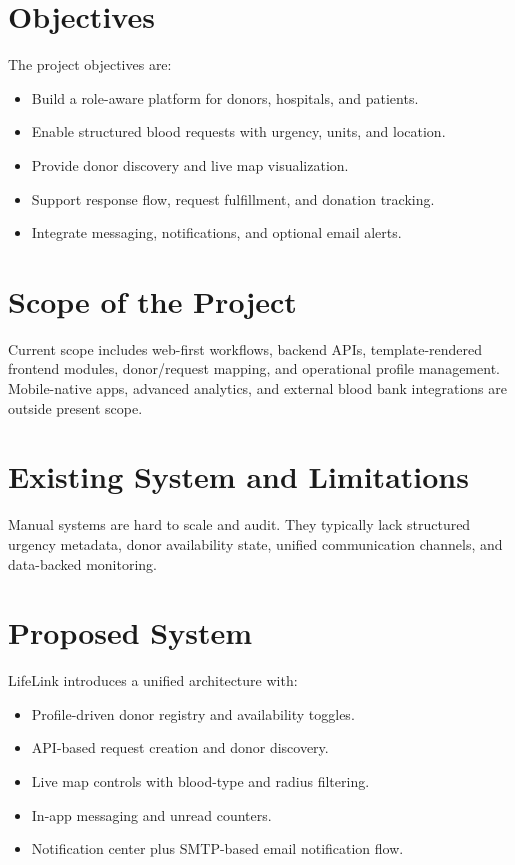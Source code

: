 \documentclass[12pt,a4paper]{report}
\begin{document}
\section{Objectives}
The project objectives are:
\begin{itemize}[leftmargin=1.5em]
\item Build a role-aware platform for donors, hospitals, and patients.
\item Enable structured blood requests with urgency, units, and location.
\item Provide donor discovery and live map visualization.
\item Support response flow, request fulfillment, and donation tracking.
\item Integrate messaging, notifications, and optional email alerts.
\end{itemize}

\section{Scope of the Project}
Current scope includes web-first workflows, backend APIs, template-rendered frontend modules, donor/request mapping, and operational profile management. Mobile-native apps, advanced analytics, and external blood bank integrations are outside present scope.

\section{Existing System and Limitations}
Manual systems are hard to scale and audit. They typically lack structured urgency metadata, donor availability state, unified communication channels, and data-backed monitoring.

\section{Proposed System}
LifeLink introduces a unified architecture with:
\begin{itemize}[leftmargin=1.5em]
\item Profile-driven donor registry and availability toggles.
\item API-based request creation and donor discovery.
\item Live map controls with blood-type and radius filtering.
\item In-app messaging and unread counters.
\item Notification center plus SMTP-based email notification flow.
\end{itemize}
\end{document}
